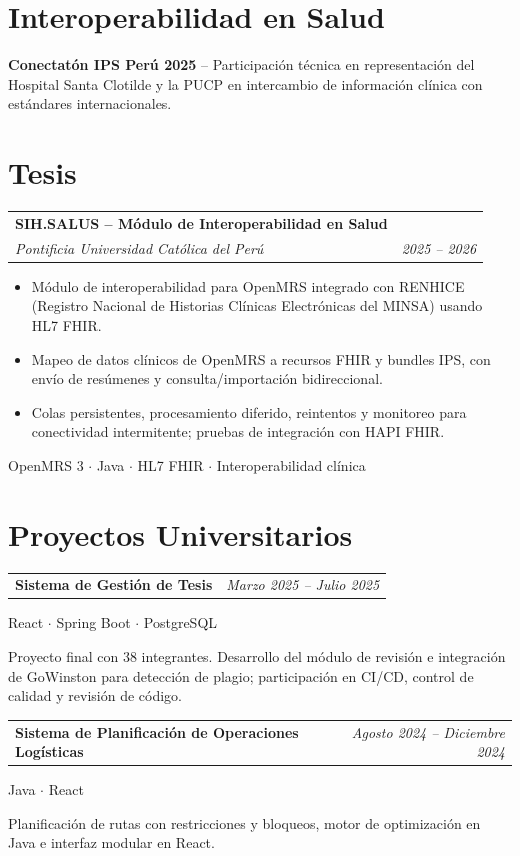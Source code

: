 \documentclass[a4paper,10pt]{article}
\makeatletter
\newcommand{\cvsubheading}[4]{
  \vspace{2pt}
  \begin{tabularx}{\textwidth}{@{}X r@{}}
    \textbf{#1} & \textit{\small #2} \\
    \textit{\small\color{graytext} #3} & \textit{\small\color{graytext} #4} \\
  \end{tabularx}\vspace{-2pt}
}
\newcommand{\cvproject}[3]{
  \vspace{2pt}
  \begin{tabularx}{\textwidth}{@{}X r@{}}
    \textbf{#1} & \textit{\small #2} \\
  \end{tabularx}
  {\small\color{graytext} #3}\vspace{-2pt}
}
\makeatother
\begin{document}
\section{Interoperabilidad en Salud}
\textbf{Conectatón IPS Perú 2025} -- Participación técnica en representación del Hospital Santa Clotilde y la PUCP en intercambio de información clínica con estándares internacionales.

\newpage
\section{Tesis}

\cvsubheading
  {SIH.SALUS -- Módulo de Interoperabilidad en Salud}{}
  {Pontificia Universidad Cat\'olica del Per\'u}{2025 -- 2026}

\begin{itemize}[leftmargin=16pt, itemsep=1.5pt, parsep=0pt, topsep=3pt]
  \item M\'odulo de interoperabilidad para OpenMRS integrado con RENHICE (Registro Nacional de Historias Cl\'inicas Electr\'onicas del MINSA) usando HL7 FHIR.
  \item Mapeo de datos clínicos de OpenMRS a recursos FHIR y bundles IPS, con envío de resúmenes y consulta/importación bidireccional.
  \item Colas persistentes, procesamiento diferido, reintentos y monitoreo para conectividad intermitente; pruebas de integración con HAPI FHIR.
\end{itemize}
{\scriptsize\color{graytext} OpenMRS 3 $\cdot$ Java $\cdot$ HL7 FHIR $\cdot$ Interoperabilidad cl\'inica} 

\section{Proyectos Universitarios}

\cvproject{Sistema de Gesti\'on de Tesis}{Marzo 2025 -- Julio 2025}{React $\cdot$ Spring Boot $\cdot$ PostgreSQL}
\par\smallskip Proyecto final con 38 integrantes. Desarrollo del módulo de revisión e integración de GoWinston para detección de plagio; participación en CI/CD, control de calidad y revisión de código.\par\medskip

\cvproject{Sistema de Planificaci\'on de Operaciones Log\'isticas}{Agosto 2024 -- Diciembre 2024}{Java $\cdot$ React}
\par\smallskip Planificación de rutas con restricciones y bloqueos, motor de optimización en Java e interfaz modular en React.\par\medskip
\end{document}

